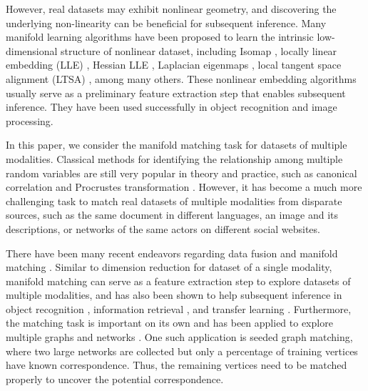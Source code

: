 \documentclass[times,twocolumn,final]{elsarticle}
\begin{document}
However, real datasets may exhibit nonlinear geometry, and discovering the underlying non-linearity can be beneficial for subsequent inference. Many manifold learning algorithms have been proposed to learn the intrinsic low-dimensional structure of nonlinear dataset, including Isomap \citep{TenenbaumSilvaLangford2000, SilvaTenenbaum2003}, locally linear embedding (LLE) \citep{SaulRoweis2000, RoweisSaul2003}, Hessian LLE \citep{DonohoGrimes2003}, Laplacian eigenmaps \citep{BelkinNiyogi2003, HeEtAl2005}, local tangent space alignment (LTSA) \citep{ZhangZha2004, ZhangWangZha2012}, among many others. %
These nonlinear embedding algorithms usually serve as a preliminary feature extraction step that enables subsequent inference. They have been used successfully in object recognition and image processing. 

In this paper, we consider the manifold matching task for datasets of multiple modalities. Classical methods for identifying the relationship among multiple random variables are still very popular in theory and practice, such as canonical correlation \citep{Hotelling1936, Kettenring1971, Hardoon2004} and Procrustes transformation \citep{Sibson1978, Sibson1979, GoldbergRitov2009, GowerProcrustesBook}. However, it has become a much more challenging task to match real datasets of multiple modalities from disparate sources, such as the same document in different languages, an image and its descriptions, or networks of the same actors on different social websites. 

There have been many recent endeavors regarding data fusion and manifold matching \citep{LafonKellerCoifman2006, WangMahadevan2008, WangMahadevan2012, SharmaKumar2012, PriebeMarchette2012, SunPriebeTang2013, ShenSunTangPriebe2014}. Similar to dimension reduction for dataset of a single modality, manifold matching can serve as a feature extraction step to explore datasets of multiple modalities, and has also been shown to help subsequent inference in object recognition \citep{KimKittlerCipolla2007}, information retrieval \citep{SunPriebe2012}, and transfer learning \citep{PanYang2010}. Furthermore, the matching task is important on its own and has been applied to explore multiple graphs and networks \citep{LyzinskiFishkindPriebe2014, JoshuaEtAl2015, LyzinskiFishkindPriebe2016}. One such application is seeded graph matching, where two large networks are collected but only a percentage of training vertices have known correspondence. Thus, the remaining vertices need to be matched properly to uncover the potential correspondence.
\end{document}
